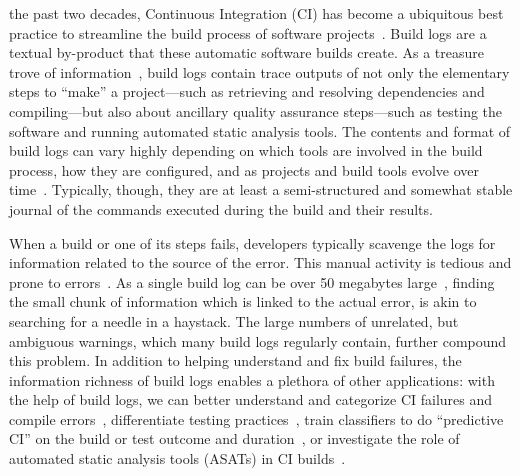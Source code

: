 
%


the past two decades, Continuous Integration (CI) has become a
ubiquitous best practice to streamline the build process of software
projects~\cite{hilton2016usage,beller2017oops,staahl2014modeling}.
Build logs are a textual by-product that these automatic software
builds create.
As a treasure trove of information~\cite{meyer},
build logs contain trace outputs of not only the elementary steps to
``make'' a project---such as retrieving and resolving dependencies and
compiling---but also about ancillary quality assurance steps---such as
testing the software and running automated static analysis tools.
The
contents and format of build logs can vary highly depending on which tools
are involved in the build process, how they are
configured, and as projects and build tools evolve over
time~\cite{staahl2014modeling}.
Typically, though, they are at least a semi-structured and
somewhat stable journal of the commands executed during the build and
their results.

When a build or one of its steps fails, developers typically scavenge
the logs for information related to the source of the error.
This
manual activity is tedious and prone to
errors~\cite{santolucito2018statically}.
As a single build log can be
over 50 megabytes large~\cite{beller2017oops}, finding the small chunk
of information which is linked to the actual error, is akin to
searching for a needle in a haystack.
The large numbers of unrelated, but ambiguous
warnings, which many build
logs regularly contain, further compound this problem.
In addition to helping
understand and fix build failures, the information richness of build
logs enables a plethora of other applications: with the help of build
logs, we can better understand and categorize CI failures and compile
errors~\cite{islam2017insights,seo2014programmers}, differentiate
testing practices~\cite{orellana2017differences,vassallo2017a-tale},
train classifiers to do ``predictive CI'' on the build or test outcome
and
duration~\cite{ni2017cost,bisong2017built,haghighatkhah2018test,
machalica2019predictive},
or investigate the role of automated static analysis tools (ASATs)
in CI
builds~\cite{zampetti2017open}.


